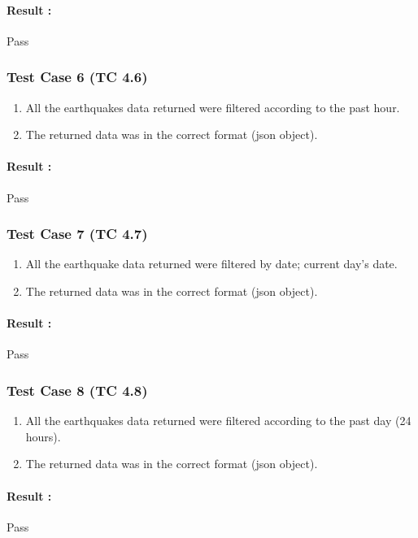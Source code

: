 \paragraph{Result :} Pass

\subsubsection{Test Case 6 (TC 4.6)}

\begin{enumerate}
	\item All the earthquakes data returned were filtered according to the past hour.
	\item The returned data was in the correct format (json object).
\end{enumerate}

\paragraph{Result :} Pass

\subsubsection{Test Case 7 (TC 4.7)}

\begin{enumerate}
	\item All the earthquake data returned were filtered by date; current day's date.
	\item The returned data was in the correct format (json object).
\end{enumerate}

\paragraph{Result :} Pass

\subsubsection{Test Case 8 (TC 4.8)}

\begin{enumerate}
	\item All the earthquakes data returned were filtered according to the past day (24 hours).
	\item The returned data was in the correct format (json object).
\end{enumerate}

\paragraph{Result :} Pass

